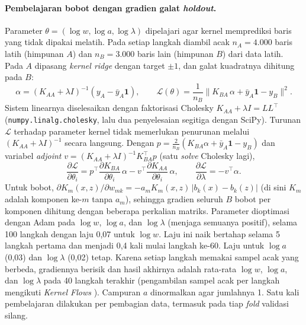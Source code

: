 \paragraph{Pembelajaran bobot dengan gradien galat \textit{holdout}.} Parameter $\theta = (\log w, \log a, \log \lambda)$ dipelajari agar kernel memprediksi baris yang tidak dipakai melatih. Pada setiap langkah diambil acak $n_A = 4.000$ baris latih (himpunan $A$) dan $n_B = 3.000$ baris lain (himpunan $B$) dari data latih. Pada $A$ dipasang \textit{kernel ridge} dengan target $\pm 1$, dan galat kuadratnya dihitung pada $B$:
\begin{equation}
	\alpha = (K_{AA} + \lambda I)^{-1}(y_A - \bar{y}_A\mathbf{1}), \qquad
	\mathcal{L}(\theta) = \frac{1}{n_B}\big\lVert K_{BA}\,\alpha + \bar{y}_A\mathbf{1} - y_B\big\rVert^2 .
	\label{eq:svm-holdout}
\end{equation}
Sistem linearnya diselesaikan dengan faktorisasi Cholesky $K_{AA} + \lambda I = LL^{\top}$ (\texttt{numpy.linalg.cholesky}, lalu dua penyelesaian segitiga dengan SciPy). Turunan $\mathcal{L}$ terhadap parameter kernel tidak memerlukan penurunan melalui $(K_{AA}+\lambda I)^{-1}$ secara langsung. Dengan $p = \tfrac{2}{n_B}(K_{BA}\alpha + \bar{y}_A\mathbf{1} - y_B)$ dan variabel \textit{adjoint} $v = (K_{AA} + \lambda I)^{-1}K_{BA}^{\top}p$ (satu \textit{solve} Cholesky lagi),
\begin{equation}
	\frac{\partial \mathcal{L}}{\partial \theta_i} = p^{\top}\frac{\partial K_{BA}}{\partial \theta_i}\,\alpha - v^{\top}\frac{\partial K_{AA}}{\partial \theta_i}\,\alpha, \qquad
	\frac{\partial \mathcal{L}}{\partial \lambda} = -v^{\top}\alpha .
	\label{eq:svm-adjoint}
\end{equation}
Untuk bobot, $\partial K_m(x,z)/\partial w_{mk} = -a_m K_m(x,z)\,|b_k(x) - b_k(z)|$ (di sini $K_m$ adalah komponen ke-$m$ tanpa $a_m$), sehingga gradien seluruh $B$ bobot per komponen dihitung dengan beberapa perkalian matriks. Parameter dioptimasi dengan Adam \cite{kingma2015adam} pada $\log w$, $\log a$, dan $\log\lambda$ (menjaga semuanya positif), selama 100 langkah dengan laju 0,07 untuk $\log w$. Laju ini naik bertahap selama 5 langkah pertama dan menjadi 0,4 kali mulai langkah ke-60. Laju untuk $\log a$ (0,03) dan $\log\lambda$ (0,02) tetap. Karena setiap langkah memakai sampel acak yang berbeda, gradiennya berisik dan hasil akhirnya adalah rata-rata $\log w$, $\log a$, dan $\log \lambda$ pada 40 langkah terakhir (pengambilan sampel acak per langkah mengikuti \textit{Kernel Flows} \cite{owhadi2019kernelflows}). Campuran $a$ dinormalkan agar jumlahnya 1. Satu kali pembelajaran dilakukan per pembagian data, termasuk pada tiap \textit{fold} validasi silang.

